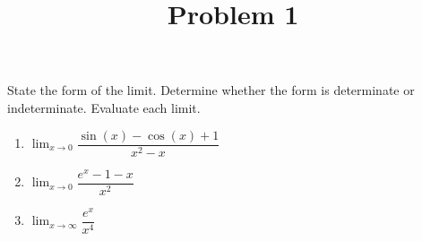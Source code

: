 \documentclass{ximera}
\title[Problem 1]{Problem 1}
\begin{document}
\begin{abstract} \end{abstract}
\maketitle

\begin{problem}
State the form of the limit. Determine whether the form is determinate or indeterminate. Evaluate each limit.  
  \begin{enumerate}
    \item  $\displaystyle \lim_{x \to 0}\dfrac{\sin(x)-\cos(x)+1}{x^2-x}$
    \item  $\displaystyle \lim_{x \to 0}\dfrac{e^x-1-x}{x^2}$
    \item  $\displaystyle \lim_{x \to \infty}\dfrac{e^x}{x^4}$
    \end{enumerate}
      \end{problem}
\end{document}
